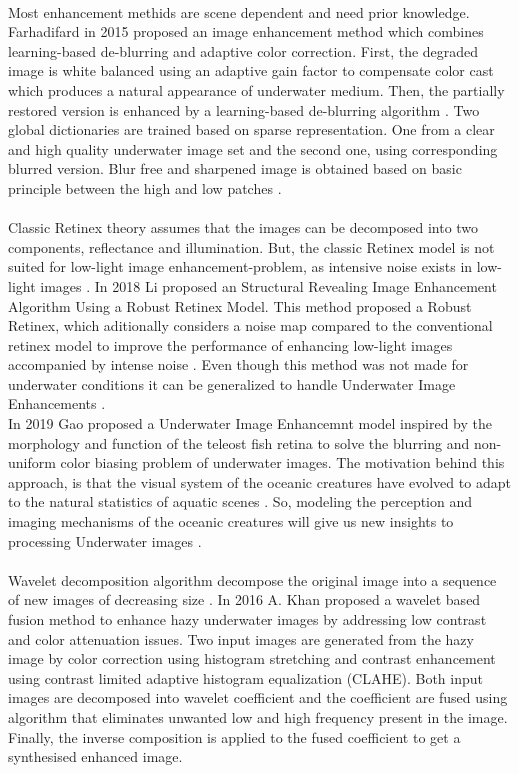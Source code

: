 \documentclass[a4paper,11pt,oneside]{article}
\begin{document}
  \\
  Most enhancement methids are scene dependent and need prior knowledge. Farhadifard \cite{14} in 2015 proposed an image enhancement method which combines learning-based de-blurring and adaptive color correction. First, the degraded image is white balanced using an adaptive gain factor to compensate color cast which produces a natural appearance of underwater medium. Then, the partially restored version is enhanced by a learning-based de-blurring algorithm \cite{14}. Two global dictionaries are trained based on sparse representation. One from a clear and high quality underwater image set and the second one, using corresponding blurred version. Blur free and sharpened image is obtained based on basic principle between the high and low patches \cite{14}.\\
  \\
  Classic Retinex theory assumes that the images can be decomposed into two components, reflectance and illumination. But, the classic Retinex model is not suited for low-light image enhancement-problem, as intensive noise exists in low-light images \cite{5}. In 2018 Li \cite{5} proposed an Structural Revealing Image Enhancement Algorithm Using a Robust Retinex Model. This method proposed a Robust Retinex, which aditionally considers a noise map compared to the conventional retinex model to improve the performance of enhancing low-light images accompanied by intense noise \cite{5}. Even though this method was not made for underwater conditions it can be generalized to handle Underwater Image Enhancements \cite{5}.\\
  In 2019 Gao \cite{6} proposed a Underwater Image Enhancemnt model inspired by the morphology and function of the teleost fish retina to solve the blurring and non-uniform color biasing problem of underwater images. The motivation behind this approach, is that the visual system of the oceanic creatures have evolved to adapt to the natural statistics of aquatic scenes \cite{6}. So, modeling the perception and imaging mechanisms of the oceanic creatures will give us new insights to processing Underwater images \cite{6}.\\
  \\
  Wavelet decomposition algorithm decompose the original image into a sequence of new images of decreasing size \cite{24}. In 2016 A. Khan \cite{9} proposed a wavelet based fusion method to enhance hazy underwater images by addressing low contrast and color attenuation issues. Two input images are generated from the hazy image by color correction using histogram stretching and contrast enhancement using contrast limited adaptive histogram equalization (CLAHE). Both input images are decomposed into wavelet coefficient and the coefficient are fused using algorithm that eliminates unwanted low and high frequency present in the image. Finally, the inverse composition is applied to the fused coefficient to get a synthesised enhanced image. \cite{9}\\
\end{document}

